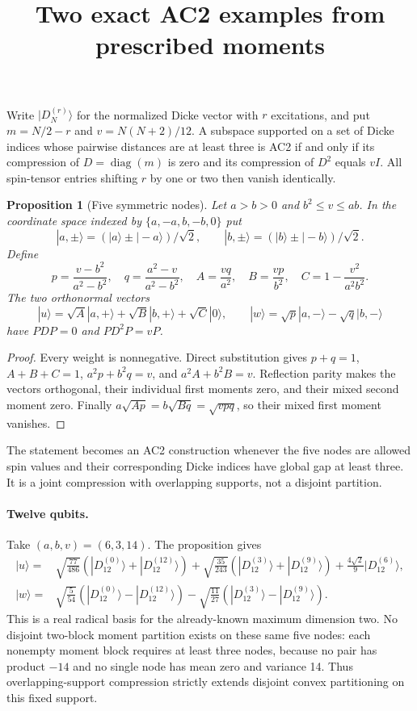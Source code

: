 \documentclass[11pt]{article}
\newtheorem{proposition}{Proposition}
\begin{document}
\title{Two exact AC2 examples from prescribed moments}
\author{}\date{}\maketitle
Write $|D_N^{(r)}\rangle$ for the normalized Dicke vector with $r$ excitations,
and put $m=N/2-r$ and $v=N(N+2)/12$. A subspace supported on a set of Dicke
indices whose pairwise distances are at least three is AC2 if and only if
its compression of $D=\operatorname{diag}(m)$ is zero and its compression of
$D^2$ equals $vI$. All spin-tensor entries shifting $r$ by one or two then
vanish identically.

\begin{proposition}[Five symmetric nodes]
Let $a>b>0$ and $b^2\le v\le ab$. In the coordinate space indexed by
$\{a,-a,b,-b,0\}$ put
\[
 |a,\pm\rangle=(|a\rangle\pm|-a\rangle)/\sqrt2,
 \qquad |b,\pm\rangle=(|b\rangle\pm|-b\rangle)/\sqrt2.
\]
Define
\[
 p=\frac{v-b^2}{a^2-b^2},\quad q=\frac{a^2-v}{a^2-b^2},\quad
 A=\frac{vq}{a^2},\quad B=\frac{vp}{b^2},\quad
 C=1-\frac{v^2}{a^2b^2}.
\]
The two orthonormal vectors
\[
 |u\rangle=\sqrt A|a,+\rangle+\sqrt B|b,+\rangle+\sqrt C|0\rangle,
 \qquad
 |w\rangle=\sqrt p|a,-\rangle-\sqrt q|b,-\rangle
\]
have $PDP=0$ and $PD^2P=vP$.
\end{proposition}
\begin{proof}
Every weight is nonnegative. Direct substitution gives
$p+q=1$, $A+B+C=1$, $a^2p+b^2q=v$, and $a^2A+b^2B=v$.
Reflection parity makes the vectors orthogonal, their individual first
moments zero, and their mixed second moment zero. Finally
$a\sqrt{Ap}=b\sqrt{Bq}=\sqrt{vpq}$, so their mixed first moment vanishes.
\end{proof}
The statement becomes an AC2 construction whenever the five nodes are
allowed spin values and their corresponding Dicke indices have global
gap at least three. It is a joint compression with overlapping supports,
not a disjoint partition.

\paragraph{Twelve qubits.}
Take $(a,b,v)=(6,3,14)$. The proposition gives
\begin{align*}
 |u\rangle={}&\sqrt{\frac{77}{486}}
 (|D_{12}^{(0)}\rangle+|D_{12}^{(12)}\rangle)
 +\sqrt{\frac{35}{243}}
 (|D_{12}^{(3)}\rangle+|D_{12}^{(9)}\rangle)
 +\frac{4\sqrt2}{9}|D_{12}^{(6)}\rangle,\\
 |w\rangle={}&\sqrt{\frac5{54}}
 (|D_{12}^{(0)}\rangle-|D_{12}^{(12)}\rangle)
 -\sqrt{\frac{11}{27}}
 (|D_{12}^{(3)}\rangle-|D_{12}^{(9)}\rangle).
\end{align*}
This is a real radical basis for the already-known maximum dimension two.
No disjoint two-block moment partition exists on these same five nodes:
each nonempty moment block requires at least three nodes, because no
pair has product $-14$ and no single node has mean zero and variance 14.
Thus overlapping-support compression strictly extends disjoint convex
partitioning on this fixed support.
\end{document}
